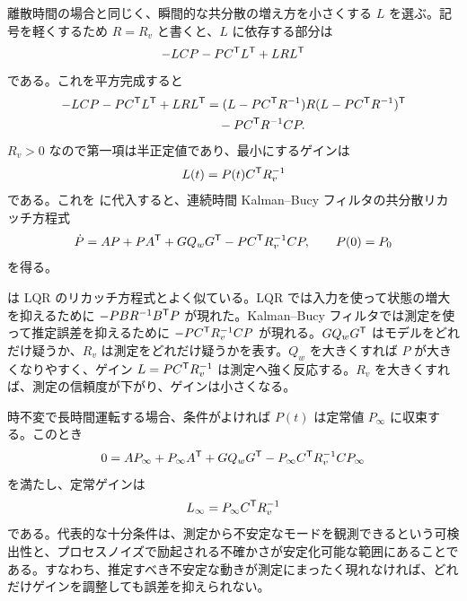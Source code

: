 \begin{derivation}
離散時間の場合と同じく、瞬間的な共分散の増え方を小さくする $L$ を選ぶ。記号を軽くするため $R=R_v$ と書くと、$L$ に依存する部分は
\begin{equation}
  -LCP-PC^{\mathsf{T}} L^{\mathsf{T}}+LRL^{\mathsf{T}}
\end{equation}
である。これを平方完成すると
\begin{align}
  -LCP-PC^{\mathsf{T}} L^{\mathsf{T}}+LRL^{\mathsf{T}}
  &=
  (L-PC^{\mathsf{T}} R^{-1})R(L-PC^{\mathsf{T}} R^{-1})^{\mathsf{T}}\\
  &\quad -PC^{\mathsf{T}} R^{-1}CP.
\end{align}
$R_v>0$ なので第一項は半正定値であり、最小にするゲインは
\begin{equation}
  L(t)=P(t)C^{\mathsf{T}} R_v^{-1}
  \label{eq:kb-gain}
\end{equation}
である。これを  に代入すると、連続時間 Kalman--Bucy フィルタの共分散リカッチ方程式
\begin{equation}
  \dot{P}
  =AP+PA^{\mathsf{T}}+GQ_wG^{\mathsf{T}}
  -PC^{\mathsf{T}} R_v^{-1}CP,
  \qquad P(0)=P_0
  \label{eq:kb-riccati}
\end{equation}
を得る。
\end{derivation}

 は LQR のリカッチ方程式とよく似ている。LQR では入力を使って状態の増大を抑えるために $-PBR^{-1}B^{\mathsf{T}} P$ が現れた。Kalman--Bucy フィルタでは測定を使って推定誤差を抑えるために $-PC^{\mathsf{T}} R_v^{-1}CP$ が現れる。$GQ_wG^{\mathsf{T}}$ はモデルをどれだけ疑うか、$R_v$ は測定をどれだけ疑うかを表す。$Q_w$ を大きくすれば $P$ が大きくなりやすく、ゲイン $L=PC^{\mathsf{T}} R_v^{-1}$ は測定へ強く反応する。$R_v$ を大きくすれば、測定の信頼度が下がり、ゲインは小さくなる。

時不変で長時間運転する場合、条件がよければ $P(t)$ は定常値 $P_\infty$ に収束する。このとき
\begin{equation}
  0=AP_\infty+P_\infty A^{\mathsf{T}}+GQ_wG^{\mathsf{T}}
  -P_\infty C^{\mathsf{T}} R_v^{-1}CP_\infty
\end{equation}
を満たし、定常ゲインは
\begin{equation}
  L_\infty=P_\infty C^{\mathsf{T}} R_v^{-1}
\end{equation}
である。代表的な十分条件は、測定から不安定なモードを観測できるという可検出性と、プロセスノイズで励起される不確かさが安定化可能な範囲にあることである。すなわち、推定すべき不安定な動きが測定にまったく現れなければ、どれだけゲインを調整しても誤差を抑えられない。

